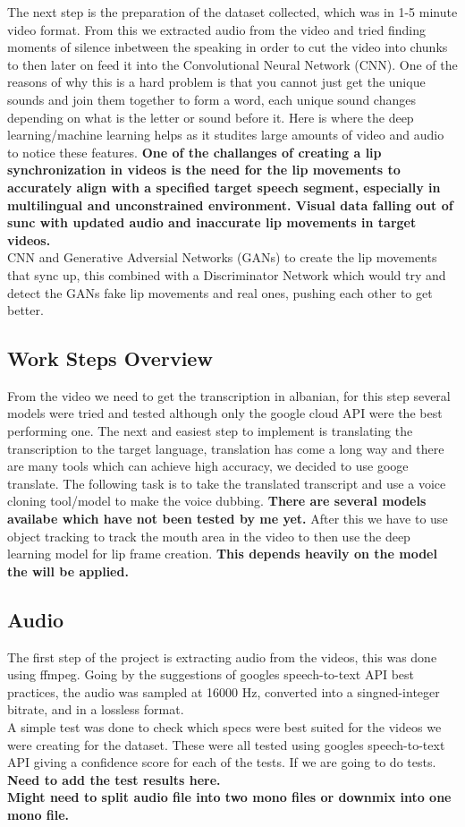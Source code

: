\documentclass[12pt]{article}
\begin{document}
The next step is the preparation of the dataset collected, which was in 1-5 minute video format. From this we extracted audio from the video and tried finding moments of silence inbetween the speaking in order to cut the video into chunks to then later on feed it into the Convolutional Neural Network (CNN).
One of the reasons of why this is a hard problem is that you cannot just get the unique sounds and join them together to form a word, each unique sound changes depending on what is the letter or sound before it. Here is where the deep learning/machine learning helps as it studites large amounts of video and audio to notice these features.
\textbf{One of the challanges of creating a lip synchronization in videos is the need for the lip movements to accurately align with a specified target speech segment, especially in multilingual and unconstrained environment. Visual data falling out of sunc with updated audio and inaccurate lip movements in target videos.}\\
CNN and Generative Adversial Networks (GANs) to create the lip movements that sync up, this combined with a Discriminator Network which would try and detect the GANs fake lip movements and real ones, pushing each other to get better.

\subsection{Work Steps Overview}

From the video we need to get the transcription in albanian, for this step several models were tried and tested although only the google cloud API were the best performing one. The next and easiest step to implement is translating the transcription to the target language, translation has come a long way and there are many tools which can achieve high accuracy, we decided to use googe translate. The following task is to take the translated transcript and use a voice cloning tool/model to make the voice dubbing. \textbf{There are several models availabe which have not been tested by me yet.} After this we have to use object tracking to track the mouth area in the video to then use the deep learning model for lip frame creation. \textbf{This depends heavily on the model the will be applied.}

\subsection{Audio}

The first step of the project is extracting audio from the videos, this was done using ffmpeg. Going by the suggestions of googles speech-to-text API best practices, the audio was sampled at 16000 Hz, converted into a singned-integer bitrate, and in a lossless format.\\
A simple test was done to check which specs were best suited for the videos we were creating for the dataset. These were all tested using googles speech-to-text API giving a confidence score for each of the tests. If we are going to do tests.\\  \textbf{Need to add the test results here. \\ Might need to split audio file into two mono files or downmix into one mono file.}
\end{document}
